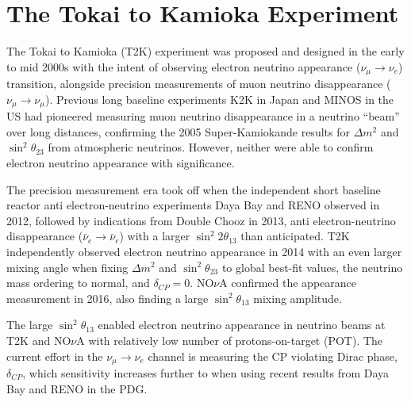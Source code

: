 \chapter{The Tokai to Kamioka Experiment}
\label{chap:detectors}

The Tokai to Kamioka (T2K) experiment was proposed and designed in the early to mid 2000s with the intent of observing electron neutrino appearance ($\nu_\mu \rightarrow \nu_e$) transition, alongside precision measurements of muon neutrino disappearance ($\nu_\mu \rightarrow \nu_\mu$)\cite{t2k_loi,t2k_prop}. Previous long baseline experiments K2K\cite{k2k_obs} in Japan and MINOS\cite{minos_obs} in the US had pioneered measuring muon neutrino disappearance in a neutrino ``beam'' over long distances, confirming the 2005 Super-Kamiokande results for $\Delta m^2$ and $\sin^2 \theta_{23}$ from atmospheric neutrinos\cite{sk_2005}. However, neither were able to confirm electron neutrino appearance with significance.

The precision measurement era took off when the independent short baseline reactor anti electron-neutrino experiments Daya Bay\cite{daya_bay_disc} and RENO\cite{reno_disc} observed in 2012, followed by indications from Double Chooz\cite{chooz_disc} in 2013, anti electron-neutrino disappearance ($\bar{\nu}_e \rightarrow \bar{\nu}_e$) with a larger $\sin^2 2\theta_{13}$ than anticipated. T2K independently observed electron neutrino appearance\cite{t2k_disc} in 2014 with an even larger mixing angle when fixing $\Delta m^2$ and $\sin^2 \theta_{23}$ to global best-fit values, the neutrino mass ordering to normal, and $\delta_{CP}=0$. NO$\nu$A confirmed\cite{nova_disc} the appearance measurement in 2016, also finding a large $\sin^2 \theta_{13}$ mixing amplitude.

The large $\sin^2 \theta_{13}$ enabled electron neutrino appearance in neutrino beams at T2K and NO$\nu$A with relatively low number of protons-on-target (POT). The current effort in the $\nu_\mu \rightarrow \nu_e$ channel is measuring the CP violating Dirac phase, $\delta_{CP}$, which sensitivity increases further to when using recent results from Daya Bay\cite{daya_bay} and RENO\cite{reno} in the PDG\cite{pdg_2017}.

